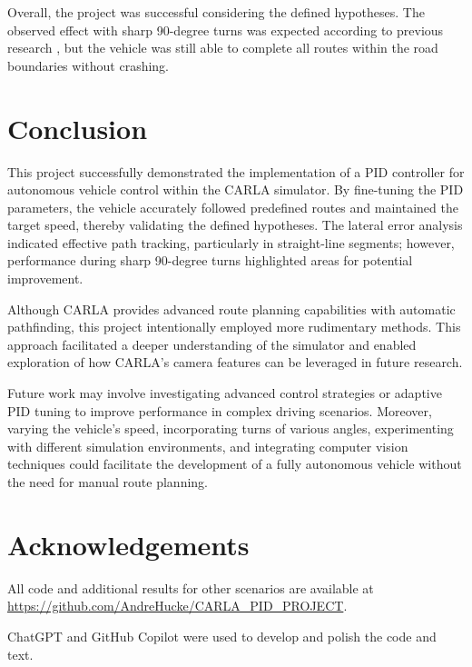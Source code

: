 \documentclass[conference]{IEEEtran}
\begin{document}
Overall, the project was successful considering the defined hypotheses. The observed effect with sharp 90-degree turns was expected according to previous research \cite{10.25165/j.ijabe.20241701.7296}, but the vehicle was still able to complete all routes within the road boundaries without crashing.

\section{Conclusion}

This project successfully demonstrated the implementation of a PID controller for autonomous vehicle control within the CARLA simulator. By fine-tuning the PID parameters, the vehicle accurately followed predefined routes and maintained the target speed, thereby validating the defined hypotheses. The lateral error analysis indicated effective path tracking, particularly in straight-line segments; however, performance during sharp 90-degree turns highlighted areas for potential improvement.

Although CARLA provides advanced route planning capabilities with automatic pathfinding, this project intentionally employed more rudimentary methods. This approach facilitated a deeper understanding of the simulator and enabled exploration of how CARLA's camera features can be leveraged in future research.

Future work may involve investigating advanced control strategies or adaptive PID tuning to improve performance in complex driving scenarios. Moreover, varying the vehicle's speed, incorporating turns of various angles, experimenting with different simulation environments, and integrating computer vision techniques could facilitate the development of a fully autonomous vehicle without the need for manual route planning.

\section{Acknowledgements}

All code and additional results for other scenarios are available at \url{https://github.com/AndreHucke/CARLA_PID_PROJECT}.

ChatGPT and GitHub Copilot were used to develop and polish the code and text.



\end{document}
